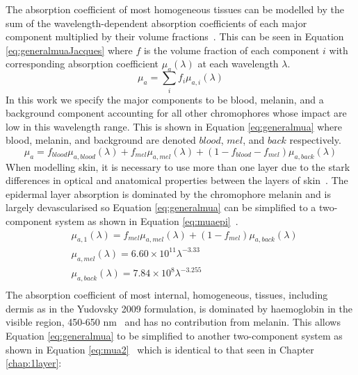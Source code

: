 The absorption coefficient of most homogeneous tissues can be modelled by the sum of the wavelength-dependent absorption coefficients of each major component multiplied by their volume fractions~\cite{Jacques2013}. 
This can be seen in Equation \eqref{eq:generalmuaJacques} where $f$ is the volume fraction of each component $i$ with corresponding absorption coefficient $\mu_a(\lambda)$ at each wavelength $\lambda$. 
\begin{equation}
    \mu_a = \sum_i{f_i\mu_{a, i}(\lambda)}
    \label{eq:generalmuaJacques}
\end{equation}
In this work we specify the major components to be blood, melanin, and a background component accounting for all other chromophores whose impact are low in this wavelength range. This is shown in Equation \eqref{eq:generalmua} where blood, melanin, and background are denoted $blood$, $mel$, and $back$ respectively.
\begin{equation}
    \mu_a = f_{blood}\mu_{a, blood}(\lambda) + f_{mel}\mu_{a, mel}(\lambda) + (1 - f_{blood} - f_{mel})\mu_{a, back}(\lambda)
    \label{eq:generalmua}
\end{equation}
When modelling skin, it is necessary to use more than one layer due to the stark differences in optical and anatomical properties between the layers of skin~\cite{Mignon2018}. The epidermal layer absorption is dominated by the chromophore melanin and is largely devascularised so Equation \eqref{eq:generalmua} can be simplified to a two-component system as shown in Equation \eqref{eq:muaepi}~\cite{Yudovsky2009}.
\begin{equation}
\begin{aligned}
    & \mu_{a, 1}(\lambda) = f_{mel}\mu_{a, mel}(\lambda) + (1-f_{mel})\mu_{a, back}(\lambda) \\
    & \mu_{a, mel}(\lambda) = 6.60\times10^{11}\lambda^{-3.33}\\
    & \mu_{a, back}(\lambda) = 7.84\times10^8\lambda^{-3.255}\\
\end{aligned}
\label{eq:muaepi}
\end{equation}
The absorption coefficient of most internal, homogeneous, tissues, including dermis as in the Yudovsky 2009 formulation, is dominated by haemoglobin in the visible region, 450-650 nm~\cite{JacquesAbs} and has no contribution from melanin. This allows Equation \eqref{eq:generalmua} to be simplified to another two-component system as shown in Equation \eqref{eq:mua2}~\cite{Yudovsky2009} which is identical to that seen in Chapter \ref{chap:1layer}: 
